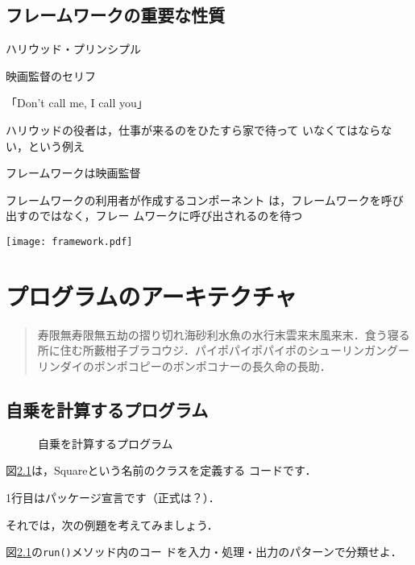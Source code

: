 \documentclass[a4j,papersize]{jsbook}
\begin{document}
\section{フレームワークの重要な性質}
ハリウッド・プリンシプル 

映画監督のセリフ 

「Don’t call me, I call you」 

 ハリウッドの役者は，仕事が来るのをひたすら家で待って
いなくてはならない，という例え 

フレームワークは映画監督 

フレームワークの利用者が作成するコンポーネント
は，フレームワークを呼び出すのではなく，フレー
ムワークに呼び出されるのを待つ 


\texttt{[image: framework.pdf]}


\chapter{プログラムのアーキテクチャ}

\begin{abstract}
寿限無寿限無五劫の摺り切れ海砂利水魚の水行末雲来末風来末．食う寝る所に住む所藪柑子ブラコウジ．パイポパイポパイポのシューリンガングーリンダイのポンポコピーのポンポコナーの長久命の長助．
\end{abstract}

\section{自乗を計算するプログラム}
\begin{figure}

\caption{自乗を計算するプログラム}\label{code:Square1:square:Square}
\end{figure}

図\ref{code:Square1:square:Square}は，Squareという名前のクラスを定義する
コードです．

1行目はパッケージ宣言です（正式は？）．

それでは，次の例題を考えてみましょう．

\begin{例題}
 図\ref{code:Square1:square:Square}の\texttt{run()}メソッド内のコー
 ドを入力・処理・出力のパターンで分類せよ．
\end{例題}
\end{document}
